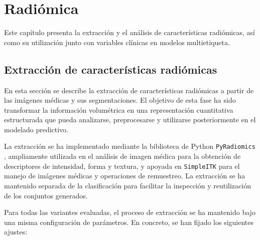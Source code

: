 \chapter{Radiómica}\label{chap:radiomica}

Este capítulo presenta la extracción y el análisis de características radiómicas, así como su utilización junto con variables clínicas en modelos multietiqueta.

\section{Extracción de características radiómicas}

En esta sección se describe la extracción de características radiómicas a partir de las imágenes médicas y sus segmentaciones. El objetivo de esta fase ha sido transformar la información volumétrica en una representación cuantitativa estructurada que pueda analizarse, preprocesarse y utilizarse posteriormente en el modelado predictivo.

La extracción se ha implementado mediante la biblioteca de Python \texttt{PyRadiomics} \cite{VanGriethuysen2017}, ampliamente utilizada en el análisis de imagen médica para la obtención de descriptores de intensidad, forma y textura, y apoyada en \texttt{SimpleITK} \cite{yaniv2018simpleitk} para el manejo de imágenes médicas y operaciones de remuestreo. La extracción se ha mantenido separada de la clasificación para facilitar la inspección y reutilización de los conjuntos generados.

Para todas las variantes evaluadas, el proceso de extracción se ha mantenido bajo una misma configuración de parámetros. En concreto, se han fijado los siguientes ajustes:

